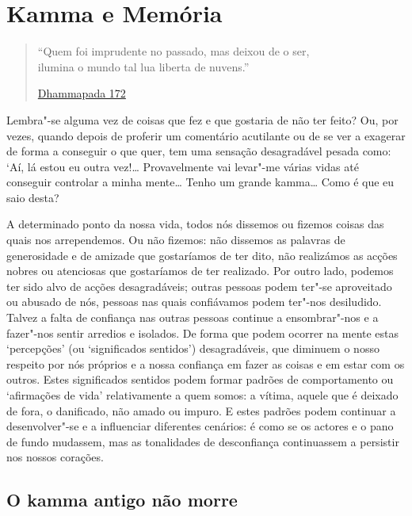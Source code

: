 
\chapter{Kamma e Memória}


\begin{quote}
  ``Quem foi imprudente no passado, mas deixou de o ser,\\
  ilumina o mundo tal lua liberta de nuvens.''

  \href{https://suttacentral.net/dhp167-178/en/buddharakkhita}{Dhammapada 172}
\end{quote}

Lembra"-se alguma vez de coisas que fez e que gostaria de não ter feito? Ou, por
vezes, quando depois de proferir um comentário acutilante ou de se ver a
exagerar de forma a conseguir o que quer, tem uma sensação desagradável pesada
como: `Aí, lá estou eu outra vez!\ldots{} Provavelmente vai levar"-me várias vidas até
conseguir controlar a minha mente\ldots{} Tenho um grande kamma\ldots{} Como é
que eu saio desta?\textquotesingle{}

A determinado ponto da nossa vida, todos nós dissemos ou fizemos coisas das
quais nos arrependemos. Ou não fizemos: não dissemos as palavras de generosidade
e de amizade que gostaríamos de ter dito, não realizámos as acções nobres ou
atenciosas que gostaríamos de ter realizado. Por outro lado, podemos ter sido
alvo de acções desagradáveis; outras pessoas podem ter"-se aproveitado ou abusado
de nós, pessoas nas quais confiávamos podem ter"-nos desiludido. Talvez a falta
de confiança nas outras pessoas continue a \mbox{ensombrar"-nos} e a fazer"-nos
sentir arredios e isolados. De forma que podem ocorrer na mente estas
`percepções' (ou `significados sentidos') desagradáveis, que diminuem o nosso
respeito por nós próprios e a nossa confiança em fazer as coisas e em estar com
os outros. Estes significados sentidos podem formar padrões de comportamento ou
`afirmações de vida' relativamente a quem somos: a vítima, aquele que é deixado
de fora, o danificado, não amado ou impuro. E estes padrões podem continuar a
desenvolver"-se e a influenciar diferentes cenários: é como se os actores e o
pano de fundo mudassem, mas as tonalidades de desconfiança continuassem a
persistir nos nossos corações.

\section{O kamma antigo não morre}


